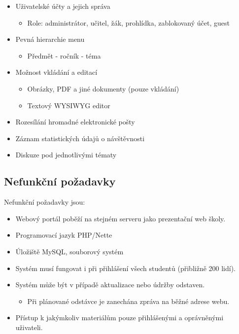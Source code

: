 \documentclass[thesis=B,czech]{FITthesis}[2012/06/26]
\begin{document}
\begin{itemize}

	\item Uživatelské účty a jejich správa
	\begin{itemize}
		\item Role: administrátor, učitel, žák, prohlídka, zablokovaný účet, guest
	\end{itemize}

	\item Pevná hierarchie menu
	\begin{itemize}
		\item Předmět - ročník - téma
	\end{itemize}
	
	\item Možnost vkládání a editací
	\begin{itemize}
		\item Obrázky, PDF a jiné dokumenty (pouze vkládání)
		\item Textový WYSIWYG editor
	\end{itemize}

	\item Rozesílání hromadné elektronické pošty
	\item Záznam statistických údajů o návštěvnosti
	\item Diskuze pod jednotlivými tématy
\end{itemize}

\subsection{Nefunkční požadavky}

Nefunkční požadavky jsou:

\begin{itemize}

	\item Webový portál poběží na stejném serveru jako prezentační web školy.
	\item Programovací jazyk PHP/Nette
	\item Úložiště MySQL, souborový systém
	\item Systém musí fungovat i při přihlášení všech studentů (přibližně 200 lidí).
	\item Systém může být v případě aktualizace nebo údržby odstaven.
	\begin{itemize}
		\item Při plánované odstávce je zanechána zpráva na běžné adrese webu.
	\end{itemize}	
	\item Přístup k jakýmkoliv materiálům pouze přihlášenými a oprávněnými uživateli.

\end{itemize}
\end{document}
